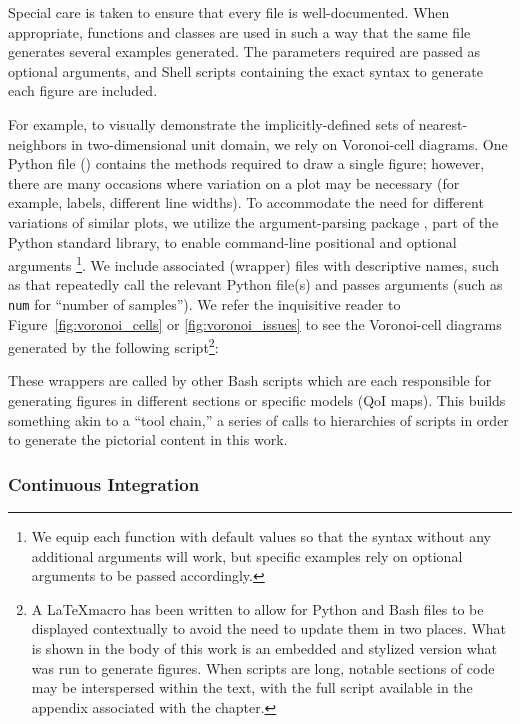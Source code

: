 Special care is taken to ensure that every file is well-documented.
When appropriate, functions and classes are used in such a way that the same file generates several examples generated.
The parameters required are passed as optional arguments, and Shell scripts containing the exact syntax to generate each figure are included.

For example, to visually demonstrate the implicitly-defined sets of nearest-neighbors in two-dimensional unit domain, we rely on Voronoi-cell diagrams.
One Python file () contains the methods required to draw a single figure; however, there are many occasions where variation on a plot may be necessary (for example, labels, different line widths).
To accommodate the need for different variations of similar plots, we utilize the argument-parsing package , part of the Python standard library, to enable command-line positional and optional arguments \footnote{We equip each function with default values so that the syntax  without any additional arguments will work, but specific examples rely on optional arguments to be passed accordingly.}.
We include associated (wrapper) files with descriptive names, such as  that repeatedly call the relevant Python file(s) and passes arguments (such as {\tt num} for ``number of samples'').
We refer the inquisitive reader to  Figure~\ref{fig:voronoi_cells} or \ref{fig:voronoi_issues} to see the Voronoi-cell diagrams generated by the following script\footnote{A \LaTeX macro has been written to allow for Python and Bash files to be displayed contextually to avoid the need to update them in two places. What is shown in the body of this work is an embedded and stylized version what was run to generate figures. When scripts are long, notable sections of code may be interspersed within the text, with the full script available in the appendix associated with the chapter.}:



These wrappers are called by other Bash scripts which are each responsible for generating figures in different sections or specific models (QoI maps).
This builds something akin to a ``tool chain,'' a series of calls to hierarchies of scripts in order to generate the pictorial content in this work.


\subsubsection{Continuous Integration}\label{sec:continuous-integration}

